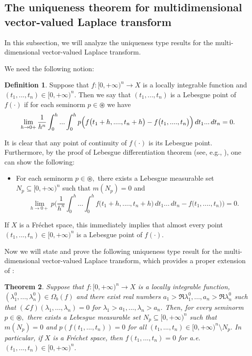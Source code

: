 \documentclass{amsart}
\newtheorem{thm}{Theorem}[section]
\theoremstyle{definition}
\newtheorem{defn}[thm]{Definition}
\theoremstyle{remark}
\numberwithin{equation}{section}
\begin{document}
\subsection{The uniqueness theorem for multidimensional vector-valued Laplace transform}\label{napolje}

In this subsection, we will analyze the uniqueness type results for the multi-dimensional vector-valued Laplace transform. 

We need the following notion:

\begin{defn}\label{leb}
Suppose that $f : [0,+\infty)^{n}\rightarrow X$ is a locally integrable function and $(t_{1},...,t_{n})\in [0,+\infty)^{n}.$ Then we say that $(t_{1},...,t_{n})$ is a Lebesgue point of $f(\cdot)$ if for each seminorm $p\in \circledast$ we have
$$
\lim_{h\rightarrow 0+}\frac{1}{h^{n}}\int^{h}_{0}...\int^{h}_{0}p\Bigl( f\bigl( t_{1}+h,....,t_{n}+h\bigr) - f\bigl( t_{1},....,t_{n}\bigr) \Bigr)\, dt_{1} ... \, dt_{n}=0.
$$
\end{defn}

It is clear that any point of continuity of $f(\cdot)$ is its Lebesgue point. 
Furthermore, by the proof of Lebesgue differentiation theorem (see, e.g., \cite[p. 157]{rudin}), one can show the following:
\begin{itemize}
\item[(LP)] For each seminorm $p\in \circledast,$ there exists a Lebesgue measurable set $N_{p}\subseteq [0,+\infty)^{n}$ such that $m(N_{p})=0$ and
$$
\lim_{h\rightarrow 0+}p\Biggl(\frac{1}{h^{n}}\int^{h}_{0}...\int^{h}_{0}f\bigl( t_{1}+h,....,t_{n}+h\bigr) \, dt_{1} ...  \, dt_{n}- f\bigl( t_{1},....,t_{n}\bigr)\Biggr)=0.
$$
\end{itemize}
If $X$ is a Fr\' echet space, this immediately implies that almost every point $(t_{1},...,t_{n})\in [0,+\infty)^{n}$ is a Lebesgue point of $f(\cdot)$.

Now we will state and prove the following uniqueness type result for the multi-dimensional vector-valued Laplace transform, which provides a proper extension of \cite[Theorem 1.4.5]{FKP}:

\begin{thm}\label{sasu}
Suppose that $f: [0,+\infty)^{n}\rightarrow X$ is a locally integrable function,  $(\lambda_{1}^{0},...,\lambda_{n}^{0})\in \Omega_{b}(f)$ and there exist real numbers $a_{1}>\Re \lambda_{1}^{0},..., a_{n}>\Re \lambda_{n}^{0}$ such that $( {\mathcal L} f) (\lambda_{1},...,\lambda_{n} )=0$ for $\lambda_{1}>a_{1},...,\lambda_{n}>a_{n}.$ Then, for every seminorm $p\in \circledast,$ there exists a Lebesgue measurable set $N_{p}\subseteq [0,+\infty)^{n}$ such that $m(N_{p})=0$ and $p(f(t_{1},...,t_{n}))=0$ for all $(t_{1},...,t_{n})\in  [0,+\infty)^{n} \setminus N_{p}.$  In particular, if $X$ is a Fr\'echet space, then $f(t_{1},...,t_{n})=0$ for a.e. $(t_{1},...,t_{n})\in [0,+\infty)^{n}. $
\end{thm}
\end{document}
